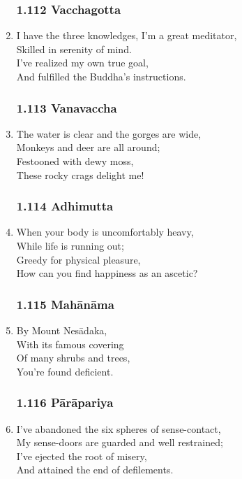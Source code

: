 \documentclass[10pt, openany]{book}
\begin{document}
\begin{enumerate}
\subsubsection*{1.112 Vacchagotta}

\item I have the three knowledges, I’m a great meditator,\\
Skilled in serenity of mind.\\
I’ve realized my own true goal,\\
And fulfilled the Buddha’s instructions.

\subsubsection*{1.113 Vanavaccha}

\item The water is clear and the gorges are wide,\\
Monkeys and deer are all around;\\
Festooned with dewy moss,\\
These rocky crags delight me!

\subsubsection*{1.114 Adhimutta}

\item When your body is uncomfortably heavy,\\
While life is running out;\\
Greedy for physical pleasure,\\
How can you find happiness as an ascetic?

\subsubsection*{1.115 Mahānāma}

\item By Mount Nesādaka,\\
With its famous covering\\
Of many shrubs and trees,\\
You’re found deficient.

\subsubsection*{1.116 Pārāpariya}

\item I’ve abandoned the six spheres of sense-contact,\\
My sense-doors are guarded and well restrained;\\
I’ve ejected the root of misery,\\
And attained the end of defilements.


\end{enumerate}
\end{document}
